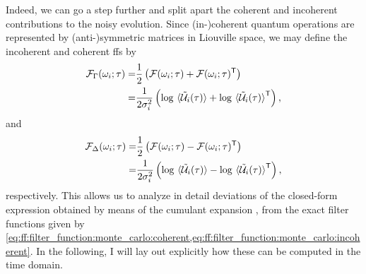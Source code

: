 Indeed, we can go a step further and split apart the coherent and incoherent contributions to the noisy evolution.
Since (in-)coherent quantum operations are represented by (anti-)symmetric matrices in Liouville space, we may define the incoherent and coherent \glspl{ff} by
\begin{equation}\label{eq:ff:filter_function:monte_carlo:incoherent}
    \begin{split}
        \mc{F}_\decayamps(\omega_i;\tau) =& \frac{1}{2}\left(\mc{F}(\omega_i;\tau) + \mc{F}(\omega_i;\tau)\transpose\right) \\
                                         =& \frac{1}{2\sigma_i^2}\left(\log\ev*{\liouvUe_i(\tau)} + \log\ev*{\liouvUe_i(\tau)}\transpose\right),
    \end{split}
\end{equation}
and
\begin{equation}\label{eq:ff:filter_function:monte_carlo:coherent}
    \begin{split}
        \mc{F}_\freqshifts(\omega_i;\tau) =& \frac{1}{2}\left(\mc{F}(\omega_i;\tau) - \mc{F}(\omega_i;\tau)\transpose\right) \\
                                          =& \frac{1}{2\sigma_i^2}\left(\log\ev*{\liouvUe_i(\tau)} - \log\ev*{\liouvUe_i(\tau)}\transpose\right),
    \end{split}
\end{equation}
respectively.
This allows us to analyze in detail deviations of the closed-form expression obtained by means of the cumulant expansion , from the exact filter functions given by \cref{eq:ff:filter_function:monte_carlo:coherent,eq:ff:filter_function:monte_carlo:incoherent}.
In the following, I will lay out explicitly how these can be computed in the time domain.

